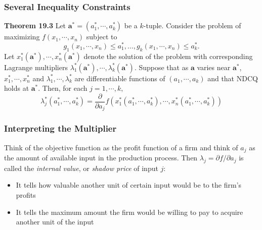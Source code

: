 \documentclass[9pt,aspectratio=169]{beamer}
\begin{document}
\begin{frame}
	\frametitle{Several Inequality Constraints}
	\begin{block}{\textbf{Theorem 19.3}}
        Let $\mathbf{a^*} = (a_1^*,\cdots,a_k^*)$ be a $k$-tuple. Consider
        the problem of maximizing $f(x_1, \cdots, x_n)$ subject to
        \begin{equation*}
            g_1(x_1,\cdots,x_n) \leq a_1^*, \ldots, g_k(x_1,\cdots,x_n) \leq
            a_k^*.
        \end{equation*}
        Let $x_1^*(\mathbf{a^*}), \cdots, x_n^*(\mathbf{a^*})$ denote the
        solution of the problem with corresponding Lagrange multipliers
        $\lambda_1^*(\mathbf{a^*}),\cdots, \lambda_k^*(\mathbf{a^*}).$
        Suppose that as $\mathbf{a}$ varies near $\mathbf{a^*}$,
        $x_1^*,\cdots,x_n^*$ and $\lambda_1^*,\cdots,\lambda_k^*$ are
        differentiable functions of $(a_1,\cdots,a_k)$ and that NDCQ holds at
        $\mathbf{a}^*$. Then, for each $j = 1,\cdots, k,$
        \begin{equation*}
            \lambda_j^*(a_1^*,\cdots,a_k^*) = \frac{\partial}{\partial
              a_j}f\left(x_1^*(a_1^*,\cdots,a_k^*),\cdots,x_n^*(a_1^*,
                \cdots, a_k^*)\right)
        \end{equation*}
	\end{block}
\end{frame}	

\begin{frame}
	\frametitle{Interpreting the Multiplier} 
    
	Think of the objective function as the profit function of a firm and
    think of $a_j$ as the amount of available input in the production
    process. Then $\lambda_j = \partial f/\partial a_j$ is called the
    \emph{internal value}, or \emph{shadow price} of input $j$:
	\begin{itemize}
		\item It tells how valuable another unit of certain input would be
        to the firm's profits
		\item It tells the maximum amount the firm would be willing to pay to
        acquire another unit of the input
	\end{itemize}

\end{frame}	
\end{document}
